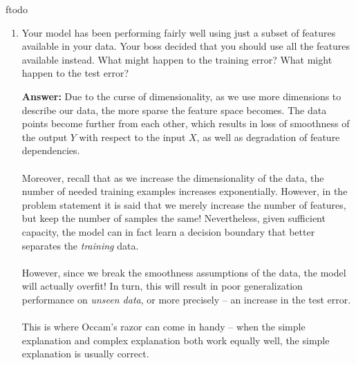 ƒtodo\documentclass{article}
\newenvironment{QandA}{\begin{enumerate}[label=\arabic*.]}{\end{enumerate}}
\newenvironment{answer}{\par\normalfont \textbf{Answer:}}{}
\begin{document}
\begin{QandA}
    \item Your model has been performing fairly well using just a subset of features available in your data. Your boss decided that you should use all the features available instead. What might happen to the training error? What might happen to the test error?
    \begin{answer}
         Due to the curse of dimensionality, as we use more dimensions to describe our data, the more sparse the feature space becomes. The data points become further from each other, which results in loss of smoothness of the output $Y$ with respect to the input $X$, as well as degradation of feature dependencies. \\\\
         Moreover, recall that as we increase the dimensionality of the data, the number of needed training examples increases exponentially. However, in the problem statement it is said that we merely increase the number of features, but keep the number of samples the same! Nevertheless, given sufficient capacity, the model can in fact learn a decision boundary that better separates the \textit{training} data. \\\\
         However, since we break the smoothness assumptions of the data, the model will actually overfit! In turn, this will result in poor generalization performance on \textit{unseen data}, or more precisely -- an increase in the test error.\\\\
         This is where Occam's razor can come in handy -- when the simple explanation and complex explanation both work equally well, the simple explanation is usually correct.
    \end{answer}
\end{QandA}
\end{document}
